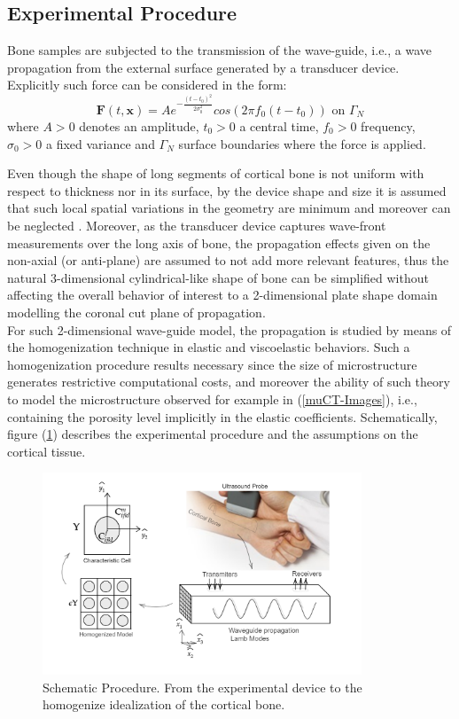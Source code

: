\subsection{Experimental Procedure}
Bone samples are subjected to the transmission of the wave-guide, i.e., a wave propagation from the external surface generated by a transducer device. 
Explicitly such force can be considered in the form:
\begin{equation*}
    \mathbf{F}(t, \mathbf{x}) = A e^{-\frac{(t-t_0)^2}{2\sigma_0^2}} cos(2 \pi f_0 (t-t_0)) \text{ on } \Gamma_N
\end{equation*}
where $A > 0$ denotes an amplitude, $t_0 > 0$ a central time, $f_0>0$ frequency, $\sigma_0>0$ a fixed variance and $\Gamma_N$ surface boundaries where the force is applied.

Even though the shape of long segments of cortical bone is not uniform with respect to thickness nor in its surface, by the device shape and size it is assumed that such local spatial variations in the geometry are minimum and moreover can be neglected \cite{Foiret2014}. Moreover, as the transducer device captures wave-front measurements over the long axis of bone, the propagation effects given on the non-axial (or anti-plane) are assumed to not add more relevant features, thus the natural 3-dimensional cylindrical-like shape of bone can be simplified without affecting the overall behavior of interest to a 2-dimensional plate shape domain modelling the coronal cut plane of propagation. \\

For such 2-dimensional wave-guide model, the propagation is studied by means of the homogenization technique in elastic and viscoelastic behaviors. Such a homogenization procedure results necessary since the size of microstructure generates restrictive computational costs, and moreover the ability of such theory to model the microstructure observed for example in (\ref{muCT-Images}), i.e., containing the porosity level implicitly in the elastic coefficients.  Schematically, figure (\ref{SchematicProp&Hom}) describes the experimental procedure and the assumptions on the cortical tissue.

\begin{figure}[!h]
	\centering
	\includegraphics[width=0.85\textwidth]{images/ImgExt/SchematicPropagation.png}
	\caption{Schematic Procedure. From the experimental device to the homogenize idealization of the cortical bone.}
	\label{SchematicProp&Hom}
\end{figure} 

